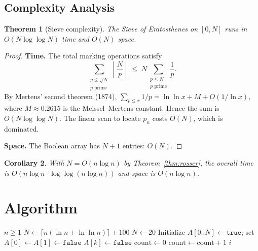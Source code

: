 \documentclass[11pt]{article}
\newtheorem{theorem}{Theorem}
\newtheorem{corollary}[theorem]{Corollary}
\begin{document}
\subsection{Complexity Analysis}

\begin{theorem}[Sieve complexity]\label{thm:complexity}
The Sieve of Eratosthenes on $[0, N]$ runs in $O(N \log\log N)$ time and $O(N)$ space.
\end{theorem}

\begin{proof}
\textbf{Time.} The total marking operations satisfy
\[
\sum_{\substack{p \le \sqrt{N} \\ p \text{ prime}}} \left\lfloor \frac{N}{p} \right\rfloor
\;\le\; N \sum_{\substack{p \le N \\ p \text{ prime}}} \frac{1}{p}.
\]
By Mertens' second theorem (1874), $\sum_{p \le x} 1/p = \ln\ln x + M + O(1/\ln x)$, where $M \approx 0.2615$ is the Meissel--Mertens constant. Hence the sum is $O(N \log\log N)$. The linear scan to locate $p_n$ costs $O(N)$, which is dominated.

\textbf{Space.} The Boolean array has $N+1$ entries: $O(N)$.
\end{proof}

\begin{corollary}
With $N = O(n \log n)$ by Theorem~\ref{thm:rosser}, the overall time is $O(n \log n \cdot \log\log(n \log n))$ and space is $O(n \log n)$.
\end{corollary}

\section{Algorithm}

\begin{algorithm}[H]
\caption{Find the $n$-th prime}
\begin{algorithmic}[1]
\REQUIRE $n \ge 1$
    \STATE $N \gets \lceil n(\ln n + \ln\ln n) \rceil + 100$
\ELSE
    \STATE $N \gets 20$
\ENDIF
\STATE Initialize $A[0..N] \gets \texttt{true}$; set $A[0] \gets A[1] \gets \texttt{false}$
            \STATE $A[k] \gets \texttt{false}$
        \ENDFOR
    \ENDIF
\ENDFOR
\STATE $\mathrm{count} \gets 0$
        \STATE $\mathrm{count} \gets \mathrm{count} + 1$
            \RETURN $i$
        \ENDIF
    \ENDIF
\ENDFOR
\end{algorithmic}
\end{algorithm}
\end{document}
